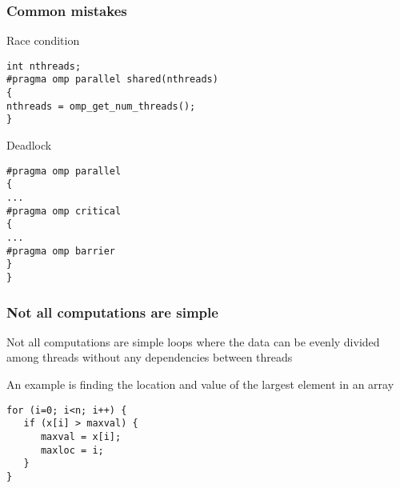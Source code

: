 \documentclass{beamer}
\begin{document}
\begin{frame}
\frametitle{Common mistakes}

\begin{block}{}
Race condition






\begin{verbatim}
int nthreads;
#pragma omp parallel shared(nthreads)
{
nthreads = omp_get_num_threads();
}

\end{verbatim}

Deadlock










\begin{verbatim}
#pragma omp parallel
{
...
#pragma omp critical
{
...
#pragma omp barrier
}
}

\end{verbatim}

\end{block}
\end{frame}

\begin{frame}
\frametitle{Not all computations are simple}

\begin{block}{}
Not all computations are simple loops where the data can be evenly 
divided among threads without any dependencies between threads

An example is finding the location and value of the largest element in an array







\begin{verbatim}
for (i=0; i<n; i++) { 
   if (x[i] > maxval) {
      maxval = x[i];
      maxloc = i; 
   }
}

\end{verbatim}

\end{block}
\end{frame}
\end{document}
